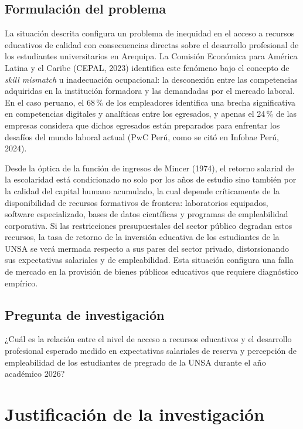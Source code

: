 \documentclass[11pt, a4paper]{article}
\begin{document}
\subsection{Formulación del problema}

La situación descrita configura un problema de inequidad en el acceso a recursos educativos de calidad con consecuencias directas sobre el desarrollo profesional de los estudiantes universitarios en Arequipa. La Comisión Económica para América Latina y el Caribe (CEPAL, 2023) identifica este fenómeno bajo el concepto de \textit{skill mismatch} u inadecuación ocupacional: la desconexión entre las competencias adquiridas en la institución formadora y las demandadas por el mercado laboral. En el caso peruano, el 68\,\% de los empleadores identifica una brecha significativa en competencias digitales y analíticas entre los egresados, y apenas el 24\,\% de las empresas considera que dichos egresados están preparados para enfrentar los desafíos del mundo laboral actual (PwC Perú, como se citó en Infobae Perú, 2024).

Desde la óptica de la función de ingresos de Mincer (1974), el retorno salarial de la escolaridad está condicionado no solo por los años de estudio sino también por la calidad del capital humano acumulado, la cual depende críticamente de la disponibilidad de recursos formativos de frontera: laboratorios equipados, software especializado, bases de datos científicas y programas de empleabilidad corporativa. Si las restricciones presupuestales del sector público degradan estos recursos, la tasa de retorno de la inversión educativa de los estudiantes de la UNSA se verá mermada respecto a sus pares del sector privado, distorsionando sus expectativas salariales y de empleabilidad. Esta situación configura una falla de mercado en la provisión de bienes públicos educativos que requiere diagnóstico empírico.

\subsection{Pregunta de investigación}

¿Cuál es la relación entre el nivel de acceso a recursos educativos y el desarrollo profesional esperado medido en expectativas salariales de reserva y percepción de empleabilidad de los estudiantes de pregrado de la UNSA durante el año académico 2026?

\section{Justificación de la investigación}
\end{document}
